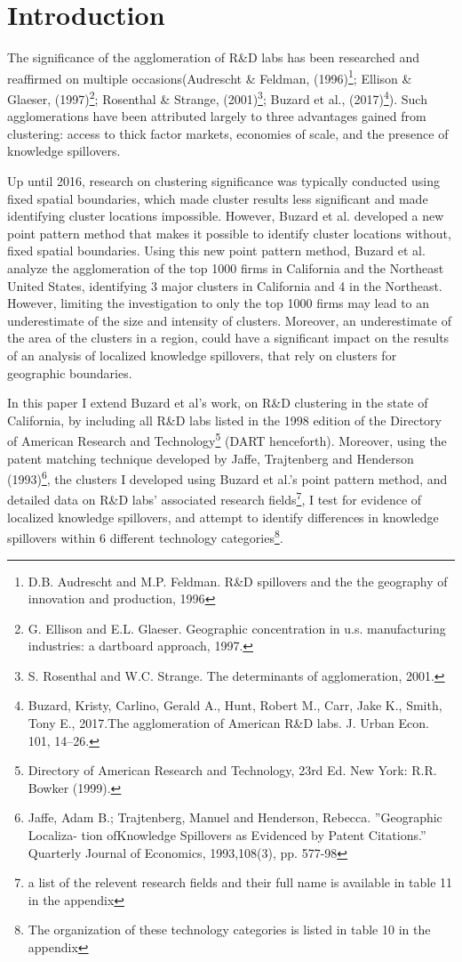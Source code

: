 \documentclass[12pt,letterpaper]{article}
\begin{document}
\section{Introduction}
The significance of the agglomeration of R\&D labs has been researched and reaffirmed on multiple occasions(Audrescht \& Feldman, (1996)\footnote{D.B. Audrescht and M.P. Feldman. R\&D spillovers and the the geography of innovation and production,
1996}; Ellison \& Glaeser, (1997)\footnote{G. Ellison and E.L. Glaeser. Geographic concentration in u.s. manufacturing industries: a dartboard approach, 1997.}; Rosenthal \& Strange, (2001)\footnote{ S. Rosenthal and W.C. Strange. The determinants of agglomeration, 2001.}; Buzard et al., (2017)\footnote{Buzard, Kristy, Carlino, Gerald A., Hunt, Robert M., Carr, Jake K., Smith, Tony E., 2017.The agglomeration of American R\&D labs. J. Urban Econ. 101, 14–26.}). Such agglomerations have been attributed largely to three advantages gained from clustering: access to thick factor markets, economies of scale, and the presence of knowledge spillovers. 
\par
Up until 2016, research on clustering significance was typically conducted using fixed spatial boundaries, which made cluster results less significant and made identifying cluster locations impossible. However, Buzard et al. developed a new point pattern method that makes it possible to identify cluster locations without, fixed spatial boundaries. Using this new point pattern method, Buzard et al. analyze the agglomeration of the top 1000 firms in California and the Northeast United States, identifying 3 major clusters in California and 4 in the Northeast. However, limiting the investigation to only the top 1000 firms may lead to an underestimate of the size and intensity of clusters. Moreover, an underestimate of the area of the clusters in a region, could have a significant impact on the results of an analysis of localized knowledge spillovers, that rely on clusters for geographic boundaries. 
\par
In this paper I extend Buzard et al's work, on R\&D clustering in the state of California, by including all R\&D labs listed in the 1998 edition of the Directory of American Research and Technology\footnote{Directory of American Research and Technology, 23rd Ed. New York: R.R. Bowker (1999).} (DART henceforth). Moreover, using the patent matching technique developed by Jaffe, Trajtenberg and Henderson (1993)\footnote{Jaffe, Adam B.; Trajtenberg, Manuel and Henderson, Rebecca. ”Geographic Localiza- tion ofKnowledge Spillovers as Evidenced by Patent Citations.” Quarterly Journal of Economics, 1993,108(3), pp. 577-98}, the clusters I developed using Buzard et al.'s point pattern method, and detailed data on R\&D labs' associated research fields\footnote{a list of the relevent research fields and their full name is available in table 11 in the appendix}, I test for evidence of localized knowledge spillovers, and attempt to identify differences in knowledge spillovers within 6 different technology categories\footnote{The organization of these technology categories is listed in table 10 in the appendix}. 
\end{document}
